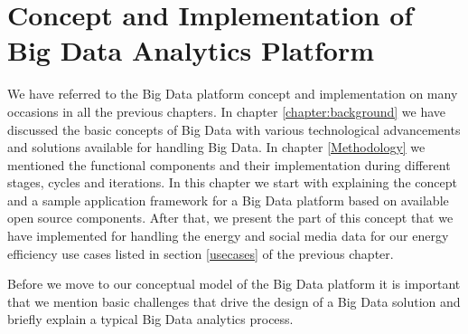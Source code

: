 \chapter[Big Data Analytics Platform]{Concept and Implementation of Big Data Analytics Platform}
\label{chapter:platform}
We have referred to the Big Data platform concept and implementation on many occasions in all the previous chapters. In chapter \ref{chapter:background} we have discussed the basic concepts of Big Data with various technological advancements and solutions available for handling Big Data. In chapter \ref{Methodology} we mentioned the functional components and their implementation during different stages, cycles and iterations. In this chapter we start with explaining the concept and a sample application framework for a Big Data platform based on available open source components. After that, we present the part of this concept that we have implemented for handling the energy and social media data for our energy efficiency use cases listed in section \ref{usecases} of the previous chapter. 

Before we move to our conceptual model of the Big Data platform it is important that we mention basic challenges that drive the design of a Big Data solution and briefly explain a typical Big Data analytics process.

